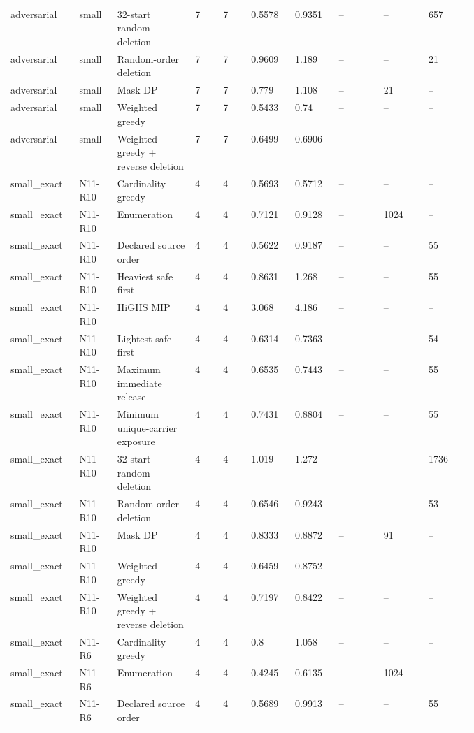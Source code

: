 {\begin{longtable}{p{0.07\linewidth}p{0.06\linewidth}p{0.13\linewidth}p{0.055\linewidth}p{0.055\linewidth}p{0.075\linewidth}p{0.075\linewidth}p{0.085\linewidth}p{0.085\linewidth}p{0.085\linewidth}}
adversarial & small & 32-start random deletion & 7 & 7 & 0.5578 & 0.9351 & -- & -- & 657 \\
adversarial & small & Random-order deletion & 7 & 7 & 0.9609 & 1.189 & -- & -- & 21 \\
adversarial & small & Mask DP & 7 & 7 & 0.779 & 1.108 & -- & 21 & -- \\
adversarial & small & Weighted greedy & 7 & 7 & 0.5433 & 0.74 & -- & -- & -- \\
adversarial & small & Weighted greedy + reverse deletion & 7 & 7 & 0.6499 & 0.6906 & -- & -- & -- \\
small\_exact & N11-R10 & Cardinality greedy & 4 & 4 & 0.5693 & 0.5712 & -- & -- & -- \\
small\_exact & N11-R10 & Enumeration & 4 & 4 & 0.7121 & 0.9128 & -- & 1024 & -- \\
small\_exact & N11-R10 & Declared source order & 4 & 4 & 0.5622 & 0.9187 & -- & -- & 55 \\
small\_exact & N11-R10 & Heaviest safe first & 4 & 4 & 0.8631 & 1.268 & -- & -- & 55 \\
small\_exact & N11-R10 & HiGHS MIP & 4 & 4 & 3.068 & 4.186 & -- & -- & -- \\
small\_exact & N11-R10 & Lightest safe first & 4 & 4 & 0.6314 & 0.7363 & -- & -- & 54 \\
small\_exact & N11-R10 & Maximum immediate release & 4 & 4 & 0.6535 & 0.7443 & -- & -- & 55 \\
small\_exact & N11-R10 & Minimum unique-carrier exposure & 4 & 4 & 0.7431 & 0.8804 & -- & -- & 55 \\
small\_exact & N11-R10 & 32-start random deletion & 4 & 4 & 1.019 & 1.272 & -- & -- & 1736 \\
small\_exact & N11-R10 & Random-order deletion & 4 & 4 & 0.6546 & 0.9243 & -- & -- & 53 \\
small\_exact & N11-R10 & Mask DP & 4 & 4 & 0.8333 & 0.8872 & -- & 91 & -- \\
small\_exact & N11-R10 & Weighted greedy & 4 & 4 & 0.6459 & 0.8752 & -- & -- & -- \\
small\_exact & N11-R10 & Weighted greedy + reverse deletion & 4 & 4 & 0.7197 & 0.8422 & -- & -- & -- \\
small\_exact & N11-R6 & Cardinality greedy & 4 & 4 & 0.8 & 1.058 & -- & -- & -- \\
small\_exact & N11-R6 & Enumeration & 4 & 4 & 0.4245 & 0.6135 & -- & 1024 & -- \\
small\_exact & N11-R6 & Declared source order & 4 & 4 & 0.5689 & 0.9913 & -- & -- & 55 \\

\end{longtable}}
